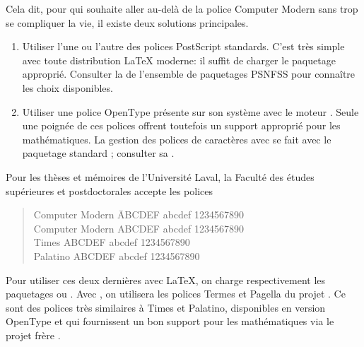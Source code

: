 Cela dit, pour qui souhaite aller au-delà de la police Computer Modern
sans trop se compliquer la vie, il existe deux solutions principales.

\begin{enumerate}
\item Utiliser l'une ou l'autre des polices PostScript standards.
  C'est très simple avec toute distribution {\LaTeX} moderne: il
  suffit de charger le paquetage approprié. Consulter la %
  de l'ensemble de paquetages PSNFSS pour connaître les choix
  disponibles.
\item Utiliser une police OpenType présente sur son système avec le
  moteur {\XeLaTeX}. Seule une poignée de ces polices offrent
  toutefois un support approprié pour les mathématiques. La gestion
  des polices de caractères avec {\XeLaTeX} se fait avec le paquetage
  standard ; consulter sa %
  .
\end{enumerate}

Pour les thèses et mémoires de l'Université Laval, la Faculté des
études supérieures et postdoctorales accepte les polices %
\begin{quote}
  \begin{tabbing}
    Computer Modern \qquad \=  ABCDEF abcdef 1234567890 \kill \\
    {\CM Computer Modern} \> {\CM ABCDEF abcdef 1234567890} \\
    {\Times Times} \> {\Times ABCDEF abcdef 1234567890} \\
    {\Palatino Palatino} \> {\Palatino ABCDEF abcdef 1234567890}
  \end{tabbing}
\end{quote}
Pour utiliser ces deux dernières avec {\LaTeX}, on charge
respectivement les paquetages  ou . Avec
{\XeLaTeX}, on utilisera les polices Termes et Pagella du projet %
.
Ce sont des polices très similaires à Times et Palatino, disponibles
en version OpenType et qui fournissent un bon support pour les
mathématiques via le projet frère %
.

